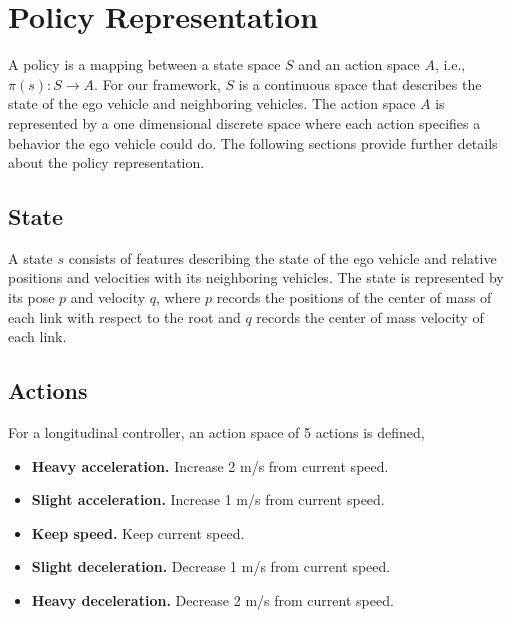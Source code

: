 \section{Policy Representation}

A policy is a mapping between a state space $S$ and an action space $A$, i.e., $\pi(s) : S \to A$. For our framework, $S$ is a continuous space that describes the state of the ego vehicle and neighboring vehicles. The action space $A$ is represented by a one dimensional discrete space where each action specifies a behavior the ego vehicle could do. The following sections provide further details about the policy representation.

\subsection{State}

A state $s$ consists of features describing the state of the ego vehicle and relative positions and velocities with its neighboring vehicles. The state is represented by its pose $p$ and velocity $q$, where $p$ records the positions of the center of mass of each link with respect to the root and $q$ records the center of mass velocity of each link.

\subsection{Actions}

For a longitudinal controller, an action space of 5 actions is defined,

\begin{itemize}

    \item \textbf{Heavy acceleration.} Increase 2 m/s from current speed.
    
    \item \textbf{Slight acceleration.} Increase 1 m/s from current speed.
    
    \item \textbf{Keep speed.} Keep current speed.
    
    \item \textbf{Slight deceleration.} Decrease 1 m/s from current speed.
    
    \item \textbf{Heavy deceleration.} Decrease 2 m/s from current speed.

\end{itemize}

